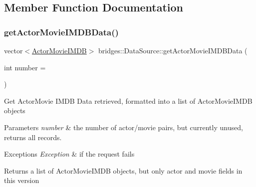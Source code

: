 \subsection{Member Function Documentation}
\mbox{\label{classbridges_1_1_data_source_a664694136550312ab3f5a82bebb91bca}} 
\subsubsection{\texorpdfstring{get\+Actor\+Movie\+I\+M\+D\+B\+Data()}{getActorMovieIMDBData()}}
{\footnotesize\ttfamily vector$<$\hyperlink{classbridges_1_1dataset_1_1_actor_movie_i_m_d_b}{Actor\+Movie\+I\+M\+DB}$>$ bridges\+::\+Data\+Source\+::get\+Actor\+Movie\+I\+M\+D\+B\+Data (\begin{DoxyParamCaption}\item[{int}]{number = {} }\end{DoxyParamCaption})\hspace{0.3cm}{\ttfamily [inline]}}

Get Actor\+Movie I\+M\+DB Data retrieved, formatted into a list of Actor\+Movie\+I\+M\+DB objects


\begin{DoxyParams}{Parameters}
{\em number} & the number of actor/movie pairs, but currently unused, returns all records. \\
\hline
\end{DoxyParams}

\begin{DoxyExceptions}{Exceptions}
{\em Exception} & if the request fails\\
\hline
\end{DoxyExceptions}
\begin{DoxyReturn}{Returns}
a list of Actor\+Movie\+I\+M\+DB objects, but only actor and movie fields in this version 
\end{DoxyReturn}
\mbox{\label{classbridges_1_1_data_source_a00f0a0a1871d4864c6ccdd04195e0fb2}} 
